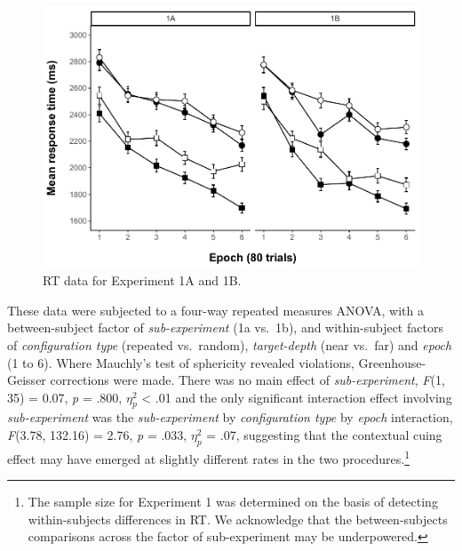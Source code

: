 \documentclass[
  english,
  man,floatsintext]{apa7}
\begin{document}
\begin{figure}

{\centering \includegraphics[width=1\linewidth]{CCVR_manuscript_files/figure-latex/Exp1-RT-figure-1} 

}

\caption{RT data for Experiment 1A and 1B.}\label{fig:Exp1-RT-figure}
\end{figure}

These data were subjected to a four-way repeated measures ANOVA, with a between-subject factor of \emph{sub-experiment} (1a vs.~1b), and within-subject factors of \emph{configuration type} (repeated vs.~random), \emph{target-depth} (near vs.~far) and \emph{epoch} (1 to 6). Where Mauchly's test of sphericity revealed violations, Greenhouse-Geisser corrections were made. There was no main effect of \emph{sub-experiment}, \emph{F}(1, 35) = 0.07, \emph{p} = .800, \(\eta^2_p\) \textless{} .01 and the only significant interaction effect involving \emph{sub-experiment} was the \emph{sub-experiment} by \emph{configuration type} by \emph{epoch} interaction, \emph{F}(3.78, 132.16) = 2.76, \emph{p} = .033, \(\eta^2_p\) = .07, suggesting that the contextual cuing effect may have emerged at slightly different rates in the two procedures.\footnote{The sample size for Experiment 1 was determined on the basis of detecting within-subjects differences in RT. We acknowledge that the between-subjects comparisons across the factor of sub-experiment may be underpowered.}
\end{document}
